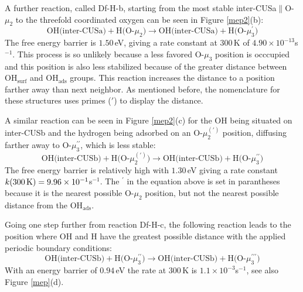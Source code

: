 \documentclass[11pt,DIV=13,BCOR=5mm,a4paper,headinclude]{scrbook}
\begin{document}
A further reaction, called Df-H-b, starting from the most stable inter-CUSa$\parallel$O-$\mu_2$ to the threefold coordinated oxygen can be seen in Figure \ref{mep2}(b):
\begin{equation}
 \text{OH(inter-CUSa)} + \text{H(O-$\mu_2$)} \rightarrow \text{OH(inter-CUSa)} + \text{H(O-$\mu_3^\prime$)} \tag{Df-H-b}
     \label{diffHb}
\end{equation}
The free energy barrier is $1.50\,$eV, giving a rate constant at $300\,$K of $4.90\times 10^{-13}$s$^{-1}$.
This process is so unlikely because a less favored O-$\mu_3$ position is occcupied and this position is also less stabilized because of the greater distance between OH$_{\text{surf}}$ and OH$_{\text{ads}}$ groups.
This reaction increases the distance to a position farther away than next neighbor.
As mentioned before, the nomenclature for these structures uses primes ($\prime$) to display the distance.


A similar reaction can be seen in Figure \ref{mep2}(c) for the OH being situated on inter-CUSb and the hydrogen being adsorbed on an O-$\mu_2^{(\prime)}$ position, diffusing farther away to O-$\mu_3^{\prime\prime}$, which is less stable:
\begin{equation}
 \text{OH(inter-CUSb)} + \text{H(O-$\mu_2^{(\prime)}$)} \rightarrow \text{OH(inter-CUSb)} + \text{H(O-$\mu_3^{\prime\prime}$)} \tag{Df-H-c}
     \label{diffHc}
\end{equation}
The free energy barrier is relatively high with $1.30\,$eV giving a rate constant $k(\textrm{300\,K})=9.96\times 10^{-1}$s$^{-1}$.
The $^\prime$ in the equation above is set in parantheses because it is the nearest possible O-$\mu_2$ position, but not the nearest possible distance from the OH$_\textrm{ads}$.

Going one step further from reaction Df-H-c, the following reaction leads to the position where OH and H have the greatest possible distance with the applied periodic boundary conditions:
\begin{equation}
 \text{OH(inter-CUSb)} + \text{H(O-$\mu_3^{\prime\prime}$)} \rightarrow \text{OH(inter-CUSb)} + \text{H(O-$\mu_3^{\prime\prime\prime}$)} \tag{Df-H-d}
     \label{diffHd}
\end{equation}
With an energy barrier of $0.94\,$eV the rate at $300\,$K is $1.1\times 10^{-3}$s$^{-1}$, see also Figure \ref{mep}(d).
\end{document}
